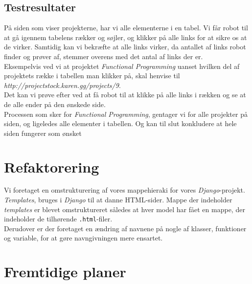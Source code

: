 \documentclass[11pt]{article}
\begin{document}
\subsection{Testresultater}
På siden som viser projekterne, har vi alle elementerne i en tabel. Vi får robot til at gå igennem tabelens rækker og søjler, og klikker på alle links for at sikre os at de virker. Samtidig kan vi bekræfte at alle links virker, da antallet af links robot finder og prøver af, stemmer overens med det antal af links der er. \\
Eksempelvis ved vi at projektet \textit{Functional Programming} uanset hvilken del af projektets række i tabellen man klikker på, skal henvise til \textit{http://projectstock.karen.gg/projects/9}. \\
Det kan vi prøve efter ved at få robot til at klikke på alle links i rækken og se at de alle ender på den ønskede side. \\
Processen som sker for \textit{Functional Programming}, gentager vi for alle projekter på siden, og ligeledes alle elementer i tabellen. Og kan til slut konkludere at hele siden fungerer som ønsket\\


\section{Refaktorering}
Vi foretaget en omstrukturering af vores mappehieraki for vores \textit{Django}-projekt. \textit{Templates}, bruges i \textit{Django} til at danne HTML-sider. Mappe der indeholder \textit{templates} er blevet omstruktureret således at hver model har fået en mappe, der indeholder de tilhørende \texttt{.html}-filer. \\
Derudover er der foretaget en ændring af navnene på nogle af klasser, funktioner og variable, for at gøre navngivningen mere ensartet.

\section{Fremtidige planer}
\end{document}
